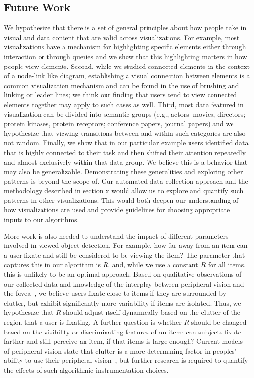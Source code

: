 \subsection{Future Work}
\label{sec:FutureWork}
We hypothesize that there is a set of general principles about how people take in visual and data content that are valid across visualizations. For example, most visualizations have a mechanism for highlighting specific elements either through interaction or through queries and we show that this highlighting matters in how people view elements. Second, while we studied connected elements in the context of a node-link like diagram, establishing a visual connection between elements is a common visualization mechanism and can be found in the use of  brushing and linking or leader lines; we think our finding that users tend to view connected elements together may apply to such cases as well. Third, most data featured in visualization can be divided into semantic groups (e.g., actors, movies, directors; protein kinases, protein receptors; conference papers, journal papers) and we hypothesize that viewing transitions between and within such categories are also not random. Finally, we show that in our particular example users identified data that is highly connected to their task and then shifted their attention repeatedly and almost exclusively within that data group. We believe this is a behavior that may also be generalizable. Demonstrating these generalities and exploring other patterns is beyond the scope of. Our automated data collection approach and the methodology described in section x would allow us to explore and quantify such patterns in other visualizations. This would both deepen our understanding of how visualizations are used and provide guidelines for choosing appropriate inputs to our algorithms. 

More work is also needed to understand the impact of different parameters involved in viewed object detection. For example, how far away from an item can a user fixate and still be considered to be viewing the item? The parameter that captures this in our algorithm is $R$, and, while we use a constant $R$ for all items, this is unlikely to be an optimal approach. Based on qualitative observations of our collected data and knowledge of the interplay between peripheral vision and the fovea~\cite{balas2009summary}, we believe users fixate close to items if they are surrounded by clutter,  but exhibit significantly more variability if items are isolated. Thus, we hypothesize that $R$ should adjust itself dynamically based on the clutter of the region that a user is fixating.  A further question is whether $R$ should be changed based on the visibility or discriminating features of an item: can subjects fixate farther and still perceive an item, if that items is large enough? Current models of peripheral vision state that clutter is a more determining factor in peoples' ability to use their peripheral vision~\cite{balas2009summary}, but further research is required to quantify the effects of such algorithmic instrumentation choices.  

